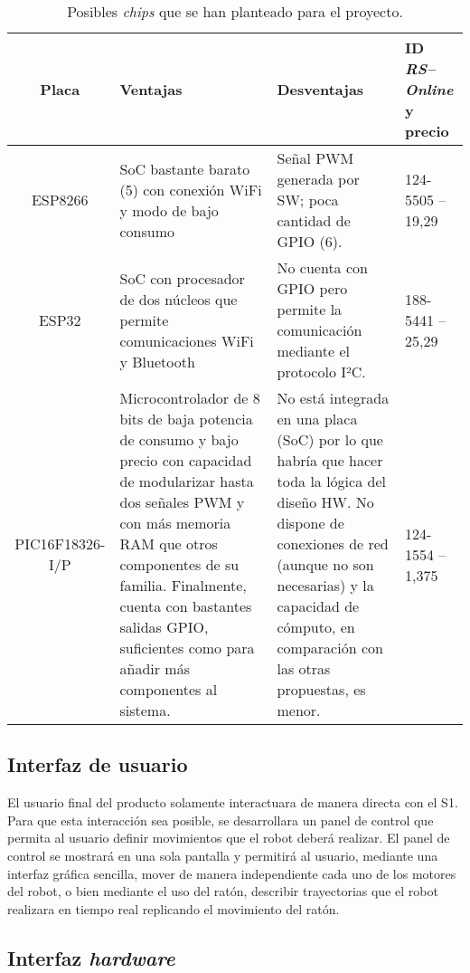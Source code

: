 \begin{table}[H]
    \centering
    \begin{tabularx}{\textwidth}{| c | X | X | X |}
        \hline
        \textbf{Placa} & \textbf{Ventajas} & \textbf{Desventajas} & \textbf{ID \textit{RS--Online} y precio} \\
        \hline
        ESP8266 & \ac{SoC} bastante barato (5\EUR{}) con conexión WiFi y modo de bajo consumo & Señal \ac{PWM} generada por \ac{SW}; poca cantidad de \ac{GPIO} (6). & 124-5505 -- 19,29\EUR{} \\
        \hline
        ESP32 & \ac{SoC} con procesador de dos núcleos que permite comunicaciones WiFi y Bluetooth & No cuenta con \ac{GPIO} pero permite la comunicación mediante el protocolo I²C. & 188-5441 -- 25,29\EUR{} \\
        \hline
        PIC16F18326-I/P & Microcontrolador de 8 bits de baja potencia de consumo y bajo precio con capacidad de modularizar hasta dos señales \ac{PWM} y con más memoria RAM que otros componentes de su familia. Finalmente, cuenta con bastantes salidas \ac{GPIO}, suficientes como para añadir más componentes al sistema. & No está integrada en una placa (\ac{SoC}) por lo que habría que hacer toda la lógica del diseño \ac{HW}. No dispone de conexiones de red (aunque no son necesarias) y la capacidad de cómputo, en comparación con las otras propuestas, es menor. & 124-1554 -- 1,375\EUR{} \\
        \hline
    \end{tabularx}
    \caption{Posibles \textit{chips} que se han planteado para el proyecto.}
    \label{tab:s2_chips}
\end{table}


\subsection{Interfaz de usuario}

El usuario final del producto solamente interactuara de manera directa con el \ac{S1}.
Para que esta interacción sea posible, se desarrollara un panel de control que permita al usuario definir movimientos que el robot deberá realizar. El panel de control se mostrará en una sola pantalla y permitirá al usuario, mediante una interfaz gráfica sencilla, mover de manera independiente cada uno de los motores del robot, o bien mediante el uso del ratón, describir trayectorias que el robot realizara en tiempo real replicando el movimiento del ratón.

\subsection{Interfaz \textit{hardware}}

